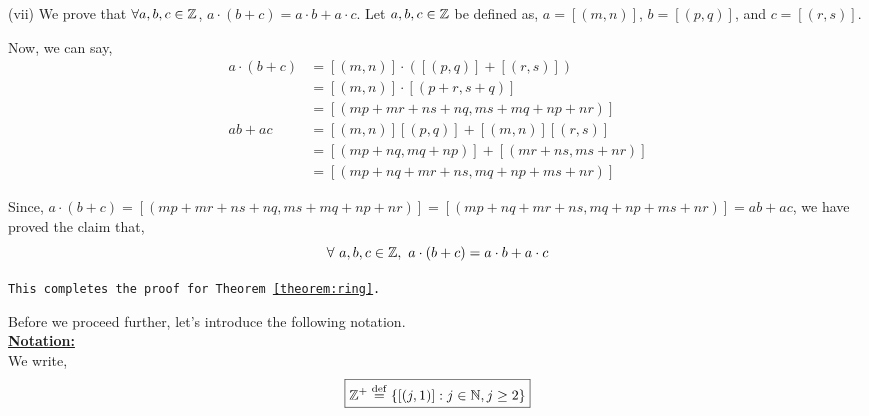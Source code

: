 \documentclass[11pt]{scrartcl}
\begin{document}
 	(vii) We prove that $\forall a,b,c \in \mathbb Z$, $a\cdot (b+c) = a\cdot b + a\cdot c$. Let $a,b,c \in \mathbb Z$ be defined as, $a = [(m,n)]$, $b = [(p,q)]$, and $c = [(r,s)]$.
 	
 	Now, we can say,
 	\begin{align*}
 		a \cdot (b+c) &= [(m,n)]\cdot ([(p,q)] + [(r,s)])\\
 		&= [(m,n)]\cdot[(p+r, s+q)]\\
 		&= [(mp+mr+ns+nq, ms+mq+np+nr)]\\
 		ab+ac &= [(m,n)][(p,q)]+[(m,n)][(r,s)]\\
 		&= [(mp+nq, mq+np)]+[(mr+ns, ms+nr)]\\
 		&= [(mp+nq+mr+ns, mq+np+ms+nr)]
 	\end{align*}
 
	Since, $a \cdot (b+c) = [(mp+mr+ns+nq, ms+mq+np+nr)] = [(mp+nq+mr+ns, mq+np+ms+nr)] = ab+ac$, we have proved the claim that,
	$$\forall\ a,b,c \in \ZZ,\ a\cdot (b+c) = a\cdot b + a\cdot c$$
	
	\begin{center}
		\texttt{This completes the proof for Theorem \ref{theorem:ring}.}
	\end{center}

	Before we proceed further, let's introduce the following notation.\\[10pt]
	\textbf{\underline{Notation: }}\\
	We write,
	$$\boxed{\mathbb Z^{+} \overset{\mathrm{def}}{=} \{[(j,1)]: j \in \mathbb N, j\geq 2\}}$$
	
\end{document}
